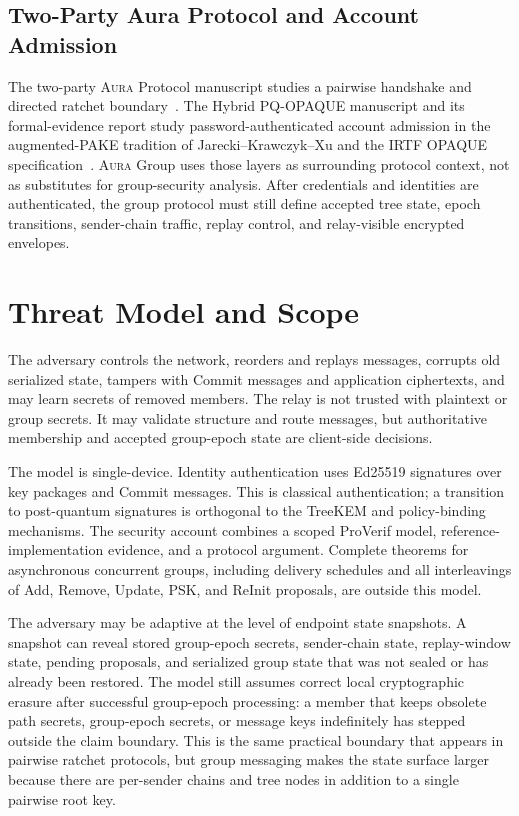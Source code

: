 \documentclass[preprint,12pt]{elsarticle}
\theoremstyle{definition}
\newcommand{\tech}[1]{\textnormal{#1}}
\newcommand{\Aura}{\textsc{Aura}}
\newcommand{\ProVerif}{\tech{ProVerif}}
\begin{document}
\subsection{Two-Party Aura Protocol and Account Admission}

The two-party \Aura{} Protocol manuscript studies a pairwise handshake and
directed ratchet boundary~\cite{melnychenko2026aura}. The Hybrid PQ-OPAQUE
manuscript and its formal-evidence report study password-authenticated account
admission in the augmented-PAKE tradition of Jarecki--Krawczyk--Xu and the
IRTF OPAQUE specification~\cite{melnychenko2026opaque,
melnychenko2026opaqueformal,jarecki2018,ietf-opaque}. \Aura{} Group uses those
layers as surrounding protocol context, not as substitutes for group-security
analysis. After credentials and identities are authenticated, the group
protocol must still define accepted tree state, epoch transitions,
sender-chain traffic, replay control, and relay-visible encrypted envelopes.

\section{Threat Model and Scope}\label{sec:threat}

The adversary controls the network, reorders and replays messages, corrupts
old serialized state, tampers with Commit messages and application ciphertexts, and may
learn secrets of removed members. The relay is not trusted with plaintext or
group secrets. It may validate structure and route messages, but authoritative
membership and accepted group-epoch state are client-side decisions.

The model is single-device. Identity authentication uses Ed25519 signatures
over key packages and Commit messages. This is classical authentication; a
transition to post-quantum signatures is orthogonal to the TreeKEM and
policy-binding mechanisms. The security account combines a scoped \ProVerif{}
model, reference-implementation evidence, and a protocol argument. Complete
theorems for asynchronous concurrent groups, including delivery schedules and
all interleavings of Add, Remove, Update, PSK, and ReInit proposals, are
outside this model.

The adversary may be adaptive at the level of endpoint state snapshots. A
snapshot can reveal stored group-epoch secrets, sender-chain state, replay-window
state, pending proposals, and serialized group state that was not sealed or
has already been restored. The model still assumes correct local cryptographic
erasure after successful group-epoch processing: a member that keeps obsolete path
secrets, group-epoch secrets, or message keys indefinitely has stepped outside the
claim boundary. This is the same practical boundary that appears in pairwise
ratchet protocols, but group messaging makes the state surface larger because
there are per-sender chains and tree nodes in addition to a single pairwise
root key.
\end{document}
